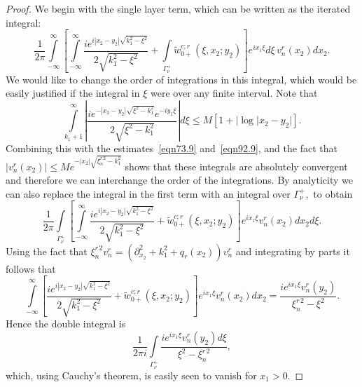 \documentclass[10pt,a4paper]{amsart}
\newcommand\pa{\partial}
\newcommand\tw{\tilde w_{0+}}
\begin{document}
\begin{proof}
  We begin with the single layer term, which can be written as the iterated
  integral:
  \begin{equation}\label{eqn213.91}
    \frac{1}{2\pi}
    \int\limits_{-\infty}^{\infty}\left[\int\limits_{-\infty}^{\infty}\frac{ie^{i|x_2-y_2|\sqrt{k_1^2-\xi^2}}}{2\sqrt{k_1^2-\xi^2}}+
       \int\limits_{\Gamma_{\nu}^+} \tw^{c;r}(\xi,x_2;y_2)\right] e^{ix_1\xi }d\xi\,v_n^{r}(x_2)dx_2.
  \end{equation}
  We would like to change the order of integrations in this integral, which
  would be  easily justified if the integral in $\xi$ were over any finite
  interval. Note that
  \begin{equation}
    \int\limits_{k_1+1}^{\infty}\left|\frac{ie^{-|x_2-y_2|\sqrt{\xi^2-k_1^2}}e^{-iy_1\xi}}{2\sqrt{\xi^2-k_1^2}}\right|d\xi\leq
    M[1+|\log|x_2-y_2|].
  \end{equation}
  Combining this with the estimates~\eqref{eqn73.9} and~\eqref{eqn92.9}, and the fact that
  $|v_n^r(x_2)|\leq Me^{-|x_2|\sqrt{\xi_n^{r\,2}-k_1^2}}$ shows that these integrals are
  absolutely convergent and therefore we can interchange the order of the
  integrations. By analyticity we can also replace the integral in the first term with an
  integral over $\Gamma_{\nu}^+,$ to obtain
   \begin{equation}
        \frac{1}{2\pi}
        \int\limits_{\Gamma_{\nu}^+}\left[\int\limits_{-\infty}^{\infty}
          \frac{ie^{i|x_2-y_2|\sqrt{k_1^2-\xi^2}}}{2\sqrt{k_1^2-\xi^2}}+
       \tw^{c;r}(\xi,x_2;y_2)\right] e^{ix_1\xi}v_n^{r}(x_2)dx_2d\xi.
   \end{equation}
   Using the fact that $\xi^{r\, 2}_nv_n^r=(\pa_{x_2}^2+k_1^2+q_r(x_2))v_n^r$ and
   integrating by parts  it follows that
   \begin{equation}\label{eqn216.93}
     \int\limits_{-\infty}^{\infty}\left[\frac{ie^{i|x_2-y_2|\sqrt{k_1^2-\xi^2}}}{2\sqrt{k_1^2-\xi^2}}+
       \tw^{c;r}(\xi,x_2;y_2)\right] e^{ix_1\xi}v_n^{r}(x_2)dx_2=\frac{ie^{ix_1\xi}v_n^r(y_2)}{\xi_n^{r\,2}-\xi^2}.
   \end{equation}
   Hence the double integral is
   \begin{equation}
     \frac{1}{2\pi i}\int\limits_{\Gamma_{\nu}^+}\frac{ie^{ix_1\xi}v_n^r(y_2)d\xi}{\xi^2-\xi_n^{r\,2}},
   \end{equation}
   which, using Cauchy's theorem, is easily seen to vanish for $x_1>0.$


\end{proof}
\end{document}
